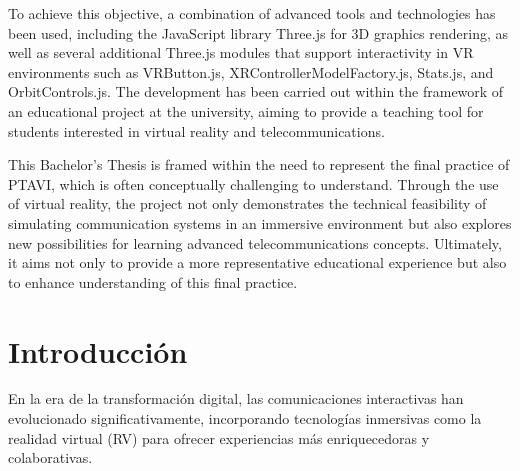 \documentclass[a4paper, 12pt]{book}
\begin{document}
\bigskip

To achieve this objective, a combination of advanced tools and technologies has been used, including the JavaScript library Three.js for 3D graphics rendering, 
as well as several additional Three.js modules that support interactivity in VR environments such as VRButton.js, XRControllerModelFactory.js, Stats.js, 
and OrbitControls.js. The development has been carried out within the framework of an educational project at the university, aiming to provide a teaching tool 
for students interested in virtual reality and telecommunications.

\bigskip

This Bachelor's Thesis is framed within the need to represent the final practice of PTAVI, which is often conceptually challenging to understand. 
Through the use of virtual reality, the project not only demonstrates the technical feasibility of simulating communication systems in an immersive environment 
but also explores new possibilities for learning advanced telecommunications concepts. Ultimately, it aims not only to provide a more representative educational 
experience but also to enhance understanding of this final practice.




\tableofcontents 
\cleardoublepage
\listoffigures %



\cleardoublepage
\chapter{Introducción}
\label{sec:intro} %
En la era de la transformación digital, las comunicaciones interactivas han evolucionado significativamente, 
incorporando tecnologías inmersivas como la realidad virtual (RV) para ofrecer experiencias más enriquecedoras y colaborativas. 
\end{document}
